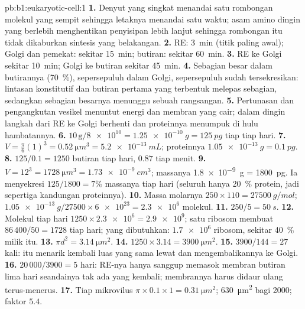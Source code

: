 \begin{solution}{pb:b1:eukaryotic-cell:1}
\textbf{1.} Denyut yang singkat menandai satu rombongan molekul yang
sempit sehingga letaknya menandai satu waktu; asam amino dingin yang
berlebih menghentikan penyisipan lebih lanjut sehingga rombongan itu
tidak dikaburkan sintesis yang belakangan.
\textbf{2.} RE: \qty{3}{min} (titik paling awal); Golgi dan 
pemekat: sekitar \qty{15}{min}; butiran: sekitar \qty{60}{min}.
\textbf{3.} RE ke Golgi sekitar \qty{10}{min}; Golgi ke butiran sekitar
\qty{45}{min}.
\textbf{4.} Sebagian besar dalam butirannya (\qty{70}{\%}),
sepersepuluh dalam Golgi, sepersepuluh sudah tersekresikan: lintasan
konstitutif dan butiran pertama yang terbentuk melepas sebagian,
sedangkan sebagian besarnya menunggu sebuah rangsangan.
\textbf{5.} Pertunasan dan pengangkutan vesikel menuntut energi dan
membran yang cair; dalam dingin langkah dari RE ke Golgi berhenti dan
proteinnya menumpuk di hulu hambatannya.
\textbf{6.} $10\,\mathrm{g}/\num{8e10} = \qty{1.25e-10}{g} =
\qty{125}{pg}$ tiap  tiap hari.
\textbf{7.} $V = \frac{\pi}{6}(1)^3 = \qty{0.52}{\micro m^3} =
\qty{5.2e-13}{mL}$; proteinnya $\qty{1.05e-13}{g} = \qty{0.1}{pg}$.
\textbf{8.} $125/0.1 = 1250$ butiran tiap hari, $0.87$ tiap menit.
\textbf{9.} $V = 12^3 = \qty{1728}{\micro m^3} = \qty{1.73e-9}{cm^3}$;
massanya \qty{1.8e-9}{g} = \qty{1800}{pg}. Ia menyekresi
$125/1800 = 7\%$ massanya tiap hari (seluruh  hanya \qty{20}{\%}
protein, jadi sepertiga kandungan proteinnya).
\textbf{10.} Massa molarnya $250\times 110 = \qty{27500}{g/mol}$;
$\qty{1.05e-13}{g}/27500\times\num{6e23} = \num{2.3e6}$ molekul.
\textbf{11.} $250/5 = \qty{50}{s}$.
\textbf{12.} Molekul tiap hari $1250\times\num{2.3e6} = \num{2.9e9}$;
satu ribosom membuat $86\,400/50 = 1728$ tiap hari; yang dibutuhkan:
$\num{1.7e6}$ ribosom, sekitar \qty{40}{\%} milik  itu.
\textbf{13.} $\pi d^2 = \qty{3.14}{\micro m^2}$.
\textbf{14.} $1250\times 3.14 = \qty{3900}{\micro m^2}$.
\textbf{15.} $3900/144 = 27$ kali:  itu menarik kembali luas yang
sama lewat  dan mengembalikannya ke Golgi.
\textbf{16.} $20\,000/3900 = 5$ hari: RE-nya hanya sanggup memasok
membran butiran lima hari seandainya tak ada yang kembali; membrannya
harus didaur ulang terus-menerus.
\textbf{17.} Tiap mikrovilus $\pi\times 0.1\times 1 =
\qty{0.31}{\micro m^2}$; \qty{630}{\micro m^2} bagi 2000; faktor $5.4$.

\end{solution}
